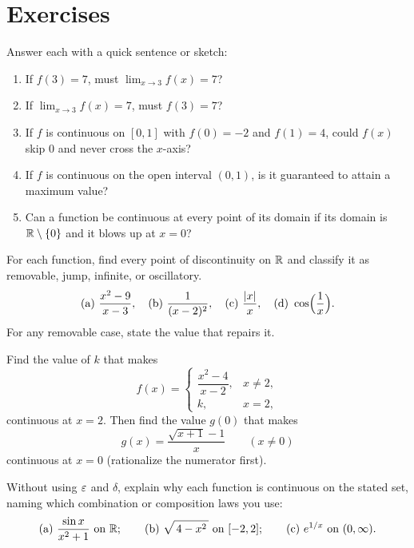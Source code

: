 \section{Exercises}
\label{ch08:exercises}

\begin{exercise}
\label{ch08:exr-mental}
Answer each with a quick sentence or sketch:
\begin{enumerate}[label=(\alph*)]
  \item If $f(3)=7$, must $\lim_{x\to 3} f(x)=7$?
  \item If $\lim_{x\to 3} f(x)=7$, must $f(3)=7$?
  \item If $f$ is continuous on $[0,1]$ with $f(0)=-2$ and $f(1)=4$, could $f(x)$ skip $0$
        and never cross the $x$-axis?
  \item If $f$ is continuous on the open interval $(0,1)$, is it guaranteed to attain a maximum value?
  \item Can a function be continuous at every point of its domain if its domain is $\mathbb{R}\setminus\{0\}$
        and it blows up at $x=0$?
\end{enumerate}
\end{exercise}

\begin{exercise}
\label{ch08:exr-classify}
For each function, find every point of discontinuity on $\mathbb{R}$ and classify it as removable,
jump, infinite, or oscillatory.
\[
  \text{(a) } \frac{x^2-9}{x-3}, \quad
  \text{(b) } \frac{1}{(x-2)^2}, \quad
  \text{(c) } \frac{\lvert x\rvert}{x}, \quad
  \text{(d) } \cos\!\Big(\frac{1}{x}\Big).
\]
For any removable case, state the value that repairs it.
\end{exercise}

\begin{exercise}
\label{ch08:exr-piecewise}
Find the value of $k$ that makes
\[
  f(x)=\begin{cases} \dfrac{x^2-4}{x-2}, & x\ne 2,\\[1.4ex] k, & x=2,\end{cases}
\]
continuous at $x=2$. Then find the value $g(0)$ that makes
\[
  g(x)=\frac{\sqrt{x+1}-1}{x}\qquad (x\ne 0)
\]
continuous at $x=0$ (rationalize the numerator first).
\end{exercise}

\begin{exercise}
\label{ch08:exr-inheritance}
Without using $\varepsilon$ and $\delta$, explain why each function is continuous on the stated
set, naming which combination or composition laws you use:
\[
  \text{(a) } \frac{\sin x}{x^2+1} \text{ on } \mathbb{R}; \qquad
  \text{(b) } \sqrt{\,4-x^2\,} \text{ on } [-2,2]; \qquad
  \text{(c) } e^{1/x} \text{ on } (0,\infty).
\]
\end{exercise}

